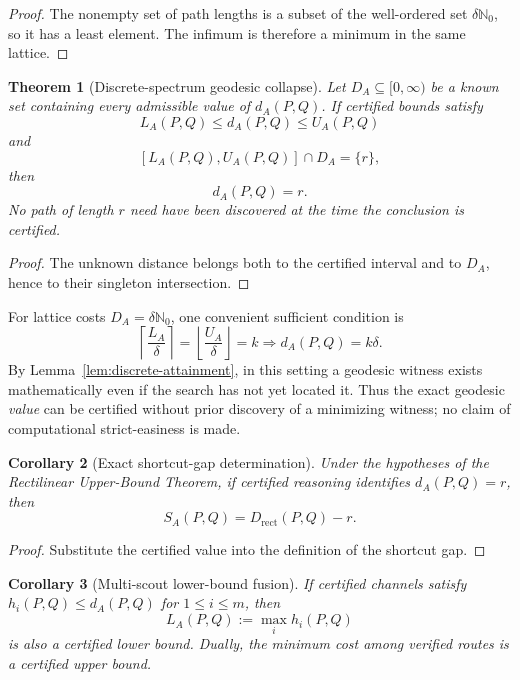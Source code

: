 \documentclass[11pt]{article}
\newtheorem{theorem}{Theorem}[section]
\newtheorem{corollary}[theorem]{Corollary}
\theoremstyle{definition}
\begin{document}
\begin{proof}
The nonempty set of path lengths is a subset of the well-ordered set $\delta\mathbb N_0$, so it has a least element.  The infimum is therefore a minimum in the same lattice.
\end{proof}

\begin{theorem}[Discrete-spectrum geodesic collapse]\label{thm:discrete-collapse}
Let $D_A\subseteq[0,\infty)$ be a known set containing every admissible value of $d_A(P,Q)$.  If certified bounds satisfy
\[
L_A(P,Q)\le d_A(P,Q)\le U_A(P,Q)
\]
and
\[
[L_A(P,Q),U_A(P,Q)]\cap D_A=\{r\},
\]
then
\[
\boxed{d_A(P,Q)=r.}
\]
No path of length $r$ need have been discovered at the time the conclusion is certified.
\end{theorem}

\begin{proof}
The unknown distance belongs both to the certified interval and to $D_A$, hence to their singleton intersection.
\end{proof}

For lattice costs $D_A=\delta\mathbb N_0$, one convenient sufficient condition is
\[
\boxed{
\left\lceil\frac{L_A}{\delta}\right\rceil
=
\left\lfloor\frac{U_A}{\delta}\right\rfloor
=k
\Longrightarrow d_A(P,Q)=k\delta.
}
\]
By Lemma~\ref{lem:discrete-attainment}, in this setting a geodesic witness exists mathematically even if the search has not yet located it.  Thus the exact geodesic \emph{value} can be certified without prior discovery of a minimizing witness; no claim of computational strict-easiness is made.

\begin{corollary}[Exact shortcut-gap determination]
Under the hypotheses of the Rectilinear Upper-Bound Theorem, if certified reasoning identifies $d_A(P,Q)=r$, then
\[
\boxed{S_A(P,Q)=D_{\mathrm{rect}}(P,Q)-r.}
\]
\end{corollary}

\begin{proof}
Substitute the certified value into the definition of the shortcut gap.
\end{proof}

\begin{corollary}[Multi-scout lower-bound fusion]
If certified channels satisfy $h_i(P,Q)\le d_A(P,Q)$ for $1\le i\le m$, then
\[
L_A(P,Q):=\max_i h_i(P,Q)
\]
is also a certified lower bound.  Dually, the minimum cost among verified routes is a certified upper bound.
\end{corollary}
\end{document}
